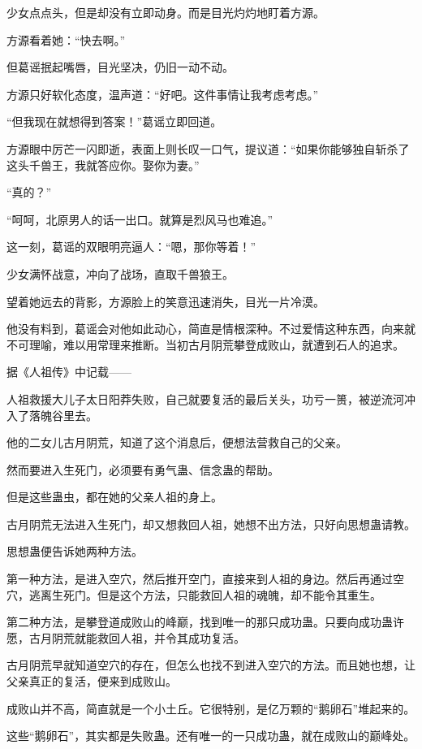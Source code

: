 \begin{this_body}
少女点点头，但是却没有立即动身。而是目光灼灼地盯着方源。

方源看着她：“快去啊。”

但葛谣抿起嘴唇，目光坚决，仍旧一动不动。

方源只好软化态度，温声道：“好吧。这件事情让我考虑考虑。”

“但我现在就想得到答案！”葛谣立即回道。

方源眼中厉芒一闪即逝，表面上则长叹一口气，提议道：“如果你能够独自斩杀了这头千兽王，我就答应你。娶你为妻。”

“真的？”

“呵呵，北原男人的话一出口。就算是烈风马也难追。”

这一刻，葛谣的双眼明亮逼人：“嗯，那你等着！”

少女满怀战意，冲向了战场，直取千兽狼王。

望着她远去的背影，方源脸上的笑意迅速消失，目光一片冷漠。

他没有料到，葛谣会对他如此动心，简直是情根深种。不过爱情这种东西，向来就不可理喻，难以用常理来推断。当初古月阴荒攀登成败山，就遭到石人的追求。

据《人祖传》中记载——

人祖救援大儿子太日阳莽失败，自己就要复活的最后关头，功亏一篑，被逆流河冲入了落魄谷里去。

他的二女儿古月阴荒，知道了这个消息后，便想法营救自己的父亲。

然而要进入生死门，必须要有勇气蛊、信念蛊的帮助。

但是这些蛊虫，都在她的父亲人祖的身上。

古月阴荒无法进入生死门，却又想救回人祖，她想不出方法，只好向思想蛊请教。

思想蛊便告诉她两种方法。

第一种方法，是进入空穴，然后推开空门，直接来到人祖的身边。然后再通过空穴，逃离生死门。但是这个方法，只能救回人祖的魂魄，却不能令其重生。

第二种方法，是攀登道成败山的峰巅，找到唯一的那只成功蛊。只要向成功蛊许愿，古月阴荒就能救回人祖，并令其成功复活。

古月阴荒早就知道空穴的存在，但怎么也找不到进入空穴的方法。而且她也想，让父亲真正的复活，便来到成败山。

成败山并不高，简直就是一个小土丘。它很特别，是亿万颗的“鹅卵石”堆起来的。

这些“鹅卵石”，其实都是失败蛊。还有唯一的一只成功蛊，就在成败山的巅峰处。


\end{this_body}
